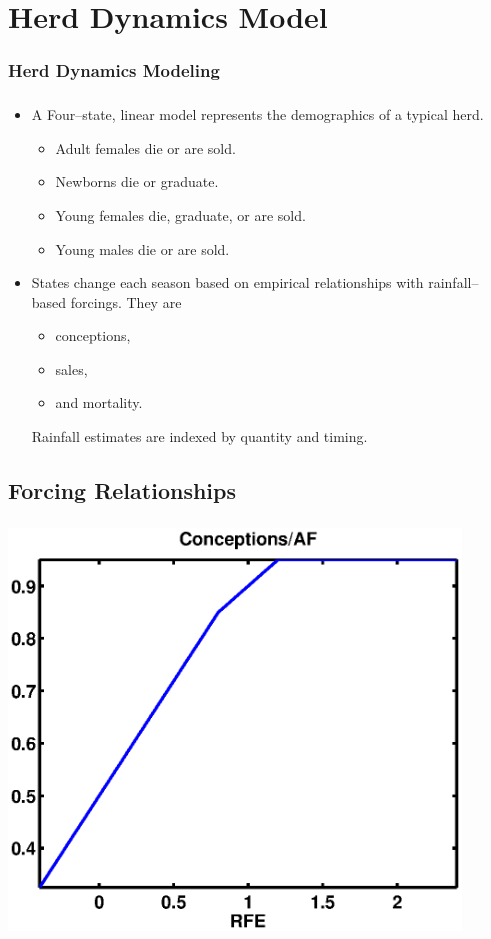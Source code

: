 \documentclass[mathserif]{beamer}
\begin{document}
\section{Herd Dynamics Model}

\begin{frame}
\frametitle{Herd Dynamics Modeling}
\tableofcontents[currentsection]
\end{frame}

\begin{frame}
\begin{center}
\frametitle{\insertsection}
\begin{itemize}
\item A Four--state, linear model represents the demographics of a typical herd.
\begin{itemize}
\item Adult females die or are sold.
\item Newborns die or graduate.
\item Young females die, graduate, or are sold.
\item Young males die or are sold.
\end{itemize}
\item States change each season based on empirical relationships with rainfall--based forcings. They are
\begin{itemize}
\item conceptions,
\item sales,
\item and mortality.
\end{itemize}
Rainfall estimates are indexed by quantity and timing.
\end{itemize}
\end{center}
\end{frame}

\subsection{Forcing Relationships}
\begin{frame}
\begin{center}
\frametitle{\insertsubsection}
\includegraphics[width=0.9\textwidth]{conceptions}
\end{center}
\end{frame}
\end{document}

